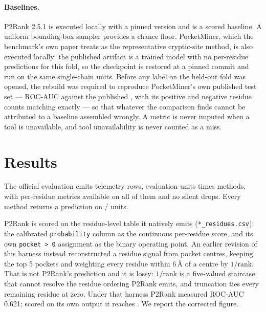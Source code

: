 \documentclass[11pt]{article}
\begin{document}
\paragraph{Baselines.} P2Rank 2.5.1 is executed locally with a pinned version and
is a scored baseline. A uniform bounding-box sampler provides a chance floor.
PocketMiner, which the benchmark's own paper treats as the representative
cryptic-site method, is also executed locally: the published artifact is a trained
model with no per-residue predictions for this fold, so the checkpoint is restored
at a pinned commit and run on the same \NUnits{} single-chain units. Before any
label on the held-out fold was opened, the rebuild was required to reproduce
PocketMiner's own published test set --- ROC-AUC \PmSelfAuc{} against the
published \PmSelfPublished{}, with its positive and negative residue counts
matching exactly --- so that whatever the comparison finds cannot be attributed to
a baseline assembled wrongly. A metric is never imputed when a tool is
unavailable, and tool unavailability is never counted as a miss.

\section{Results}
\label{sec:results}
The official evaluation emits \NRows{} telemetry rows, \NUnits{} evaluation
units times \NMethods{} methods, with per-residue metrics available on all of
them and no silent drops. Every method returns a prediction on
\NUnits{}/\NUnits{} units.

P2Rank is scored on the residue-level table it natively emits
(\texttt{*\_residues.csv}): the calibrated \texttt{probability} column as the
continuous per-residue score, and its own \texttt{pocket > 0} assignment as the
binary operating point. An earlier revision of this harness instead reconstructed
a residue signal from pocket centres, keeping the top 5 pockets and weighting
every residue within 6\,\AA{} of a centre by \(1/\text{rank}\). That is not
P2Rank's prediction and it is lossy: \(1/\text{rank}\) is a five-valued staircase
that cannot resolve the residue ordering P2Rank emits, and truncation ties every
remaining residue at zero. Under that harness P2Rank measured ROC-AUC 0.621;
scored on its own output it reaches \PtwoRAuc{}. We report the corrected figure.
\end{document}
